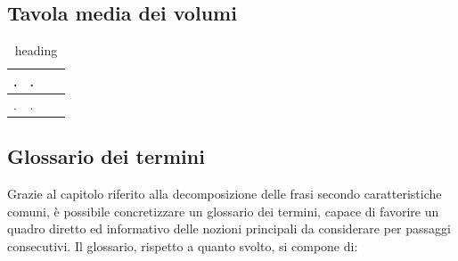 \documentclass{article}
\begin{document}
\subsection{Tavola media dei volumi}
\large
\begin{table}[h]
    \centering
    \begin{tabularx}{\textwidth}{|X|X|X|X|}
        \hline
        . & . \\
        \hline
        . & . \\
    \end{tabularx}
    \caption{heading}
\end{table}

\subsection{Glossario dei termini}
\large
Grazie al capitolo riferito alla decomposizione delle frasi secondo caratteristiche comuni, è possibile concretizzare un glossario dei termini, capace di favorire un quadro diretto ed informativo delle nozioni principali da considerare per passaggi consecutivi. Il glossario, rispetto a quanto svolto, si compone di:
\end{document}
